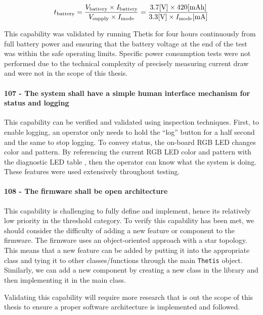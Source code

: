\begin{equation} \labeq{battery_life}
    t_{\text{battery}} = 
	\frac{V_{\text{battery}} \times I_{\text{battery}}}{V_{\text{supply}} \times I_{\text{mode}}} =
	\frac{3.7 [\text{V}] \times 420 [\text{mAh}]}{3.3 [\text{V}] \times I_{\text{mode}} [\text{mA}]}
\end{equation}

This capability was validated by running Thetis for four hours continuously from full battery power and ensuring that the battery voltage at the end of the test was within the safe operating limits.
Specific power consumption tests were not performed due to the technical complexity of precisely measuring current draw and were not in the scope of this thesis.

\paragraph*{107 - The system shall have a simple human interface mechanism for status and logging} This capability can be verified and validated using inspection techniques.
First, to enable logging, an operator only needs to hold the ``log'' button for a half second and the same to stop logging.
To convey status, the on-board RGB LED changes color and pattern.
By referencing the current RGB LED color and pattern with the diagnostic LED table \cite{ThetisUserManual}, then the operator can know what the system is doing.
These features were used extensively throughout testing.

\paragraph*{108 - The firmware shall be open architecture} This capability is challenging to fully define and implement, hence its relatively low priority in the threshold category.
To verify this capability has been met, we should consider the difficulty of adding a new feature or component to the firmware.
The firmware uses an object-oriented approach with a star topology.
This means that a new feature can be added by putting it into the appropriate class and tying it to other classes/functions through the main \lstinline[style=customInline]|Thetis| object.
Similarly, we can add a new component by creating a new class in the library and then implementing it in the main class.

Validating this capability will require more research that is out the scope of this thesis to ensure a proper software architecture is implemented and followed.

